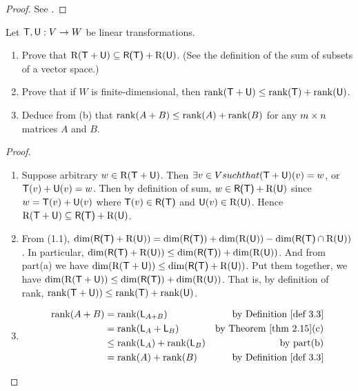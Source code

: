 \begin{proof}
See .
\end{proof}

\begin{exercise} \label{exercise 3.2.14}
Let \(\textsf{T}, \textsf{U}: V \to W\) be linear transformations.
\begin{enumerate}
\item Prove that \(\mathrm{R}(\textsf{T} + \textsf{U}) \subseteq \textsf{R(T)} + \mathrm{R}(\textsf{U})\).
(See the definition  of the sum of subsets of a vector space.)
\item Prove that if \(W\) is finite-dimensional, then \(\mathrm{rank}(\textsf{T} + \textsf{U}) \le \mathrm{rank}(\textsf{T}) + \mathrm{rank}(\textsf{U})\).
\item Deduce from (b) that \(\mathrm{rank}(A + B) \le \mathrm{rank}(A) + \mathrm{rank}(B)\) for any \(m \times n\) matrices \(A\) and \(B\).
\end{enumerate}
\end{exercise}

\begin{proof} \ 

\begin{enumerate}
\item Suppose arbitrary \(w \in \mathrm{R}(\textsf{T} + \textsf{U})\).
Then \(\exists v \in V such that (\textsf{T} + \textsf{U})(v) = w\), or \(\textsf{T}(v) + \textsf{U}(v) = w\).
Then by definition of sum, \(w \in \textsf{R(T)} + \mathrm{R}(\textsf{U})\) since \(w = \textsf{T}(v) + \textsf{U}(v)\) where \(\textsf{T}(v) \in \textsf{R(T)}\) and \(\textsf{U}(v) \in \mathrm{R}(\textsf{U})\).
Hence \(\mathrm{R}(\textsf{T} + \textsf{U}) \subseteq \textsf{R(T)} + \mathrm{R}(\textsf{U})\).

\sloppy
\item From (1.1), \(\dim(\textsf{R(T)} + \mathrm{R}(\textsf{U})) = \dim(\textsf{R(T)}) + \dim(\mathrm{R}(\textsf{U})) - \dim(\textsf{R(T)} \cap \mathrm{R}(\textsf{U}))\).
In particular, \(\dim(\textsf{R(T)} + \mathrm{R}(\textsf{U})) \le \dim(\textsf{R(T)}) + \dim(\mathrm{R}(\textsf{U}))\).
And from part(a) we have \(\dim(\mathrm{R}(\textsf{T} + \textsf{U})) \le \dim(\textsf{R(T)} + \mathrm{R}(\textsf{U}))\).
Put them together, we have \(\dim(\mathrm{R}(\textsf{T} + \textsf{U})) \le \dim(\textsf{R(T)}) + \dim(\mathrm{R}(\textsf{U}))\).
That is, by definition of rank, \(\mathrm{rank}(\textsf{T} + \textsf{U})) \le \mathrm{rank}(\textsf{T}) + \mathrm{rank}(\textsf{U})\).

\item
\begin{align*}
    \rank(A + B) & = \rank(\LMTRAN_{A + B}) & \text{by \DEF{3.3}} \\
                 & = \rank(\LMTRAN_A + \LMTRAN_B) & \text{by \THM{2.15}(c)} \\
                 & \le \rank(\LMTRAN_A) + \rank(\LMTRAN_B) & \text{by part(b)} \\
                 & = \rank(A) + \rank(B) & \text{by \DEF{3.3}}
\end{align*}
\end{enumerate}
\end{proof}

